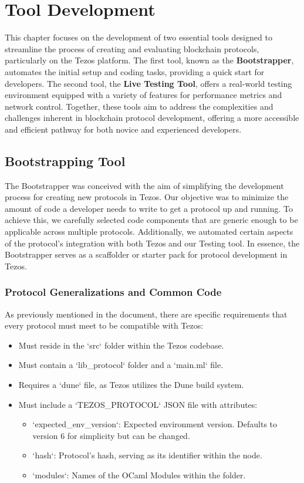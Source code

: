 \chapter{Tool Development}
This chapter focuses on the development of two essential tools designed to streamline the process of creating and evaluating blockchain protocols, particularly on the Tezos platform. The first tool, known as the \textbf{Bootstrapper}, automates the initial setup and coding tasks, providing a quick start for developers. The second tool, the \textbf{ Live Testing Tool}, offers a real-world testing environment equipped with a variety of features for performance metrics and network control. Together, these tools aim to address the complexities and challenges inherent in blockchain protocol development, offering a more accessible and efficient pathway for both novice and experienced developers.


\section{Bootstrapping Tool}
The Bootstrapper was conceived with the aim of simplifying the development process for creating new protocols in Tezos. Our objective was to minimize the amount of code a developer needs to write to get a protocol up and running. To achieve this, we carefully selected code components that are generic enough to be applicable across multiple protocols. Additionally, we automated certain aspects of the protocol's integration with both Tezos and our Testing tool. In essence, the Bootstrapper serves as a scaffolder or starter pack for protocol development in Tezos.

\subsection*{Protocol Generalizations and Common Code}

As previously mentioned in the document, there are specific requirements that every protocol must meet to be compatible with Tezos:

\begin{itemize}
\item Must reside in the `src` folder within the Tezos codebase.
\item Must contain a `lib\_protocol` folder and a `main.ml` file.
\item Requires a `dune` file, as Tezos utilizes the Dune build system.
\item Must include a `TEZOS\_PROTOCOL` JSON file with attributes:
\begin{itemize}
  \item `expected\_env\_version`: Expected environment version. Defaults to version 6 for simplicity but can be changed.
  \item `hash`: Protocol's hash, serving as its identifier within the node.
  \item `modules`: Names of the OCaml Modules within the folder.
\end{itemize}

\end{itemize}

